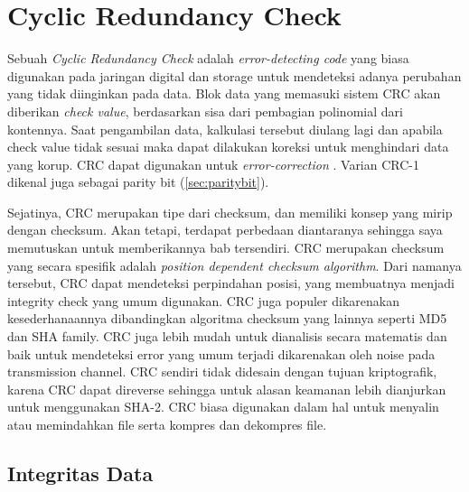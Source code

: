 \section{Cyclic Redundancy Check}
\label{sec:crc}



Sebuah \emph{Cyclic Redundancy Check} adalah \emph{error-detecting code} yang biasa digunakan pada jaringan digital dan storage untuk mendeteksi adanya perubahan yang tidak diinginkan pada data. Blok data yang memasuki sistem CRC akan diberikan \emph{check value}, berdasarkan sisa dari pembagian polinomial dari kontennya. Saat pengambilan data, kalkulasi tersebut diulang lagi dan apabila check value tidak sesuai maka dapat dilakukan koreksi untuk menghindari data yang korup. CRC dapat digunakan untuk \emph{error-correction} \citep{dobbs2003}. Varian CRC-1 dikenal juga sebagai parity bit (\ref{sec:paritybit}).

Sejatinya, CRC merupakan tipe dari checksum, dan memiliki konsep yang mirip dengan checksum. Akan tetapi, terdapat perbedaan diantaranya sehingga saya memutuskan untuk memberikannya bab tersendiri. CRC merupakan checksum yang secara spesifik adalah \emph{position dependent checksum algorithm}. Dari namanya tersebut, CRC dapat mendeteksi perpindahan posisi, yang membuatnya menjadi integrity check yang umum digunakan. CRC juga populer dikarenakan kesederhanaannya dibandingkan algoritma checksum yang lainnya seperti MD5 dan SHA family. CRC juga lebih mudah untuk dianalisis secara matematis dan baik untuk mendeteksi error yang umum terjadi dikarenakan oleh noise pada transmission channel. CRC sendiri tidak didesain dengan tujuan kriptografik, karena CRC dapat direverse sehingga untuk alasan keamanan lebih dianjurkan untuk menggunakan SHA-2. CRC biasa digunakan dalam hal untuk menyalin atau memindahkan file serta kompres dan dekompres file.

\subsection{Integritas Data}
\label{subsec:crcdataintegrity}

